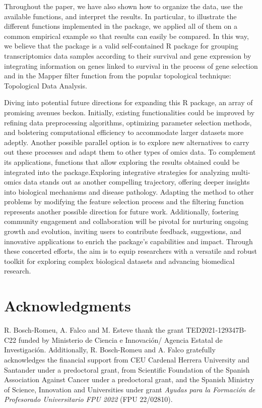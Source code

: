 Throughout the paper, we have also shown how to organize the data, use the available functions, and interpret the results. In particular, to illustrate the different functions implemented in the package, we applied all of them on a common empirical example so that results can easily be compared. In this way, we believe that the  package is a valid self-contained R package for grouping transcriptomics data samples according to their survival and gene expression by integrating information on genes linked to survival in the process of gene selection and in the Mapper filter function from the popular topological technique: Topological Data Analysis.

Diving into potential future directions for expanding this R package, an array of promising avenues beckon. Initially, existing functionalities could be improved by refining data preprocessing algorithms, optimizing parameter selection methods, and bolstering computational efficiency to accommodate larger datasets more adeptly. Another possible parallel option is to explore new alternatives to carry out these processes and adapt them to other types of omics data. To complement its applications, functions that allow exploring the results obtained could be integrated into the package.Exploring integrative strategies for analyzing multi-omics data stands out as another compelling trajectory, offering deeper insights into biological mechanisms and disease pathology. Adapting the method to other problems by modifying the feature selection process and the filtering function represents another possible direction for future work. Additionally, fostering community engagement and collaboration will be pivotal for nurturing ongoing growth and evolution, inviting users to contribute feedback, suggestions, and innovative applications to enrich the package's capabilities and impact. Through these concerted efforts, the aim is to equip researchers with a versatile and robust toolkit for exploring complex biological datasets and advancing biomedical research.

\hypertarget{acknowledgments}{%
\section{Acknowledgments}\label{acknowledgments}}

R. Bosch-Romeu, A. Falco and M. Esteve thank the grant TED2021-129347B-C22 funded by Ministerio de Ciencia e Innovación/ Agencia Estatal de Investigación. Additionally, R. Bosch-Romeu and A. Falco gratefully acknowledges the financial support from CEU Cardenal Herrera University and Santander under a predoctoral grant, from Scientific Foundation of the Spanish Association Against Cancer under a predoctoral grant, and the Spanish Ministry of Science, Innovation and Universities under grant \emph{Ayudas para la Formación de Profesorado Universitario FPU 2022} (FPU 22/02810).

